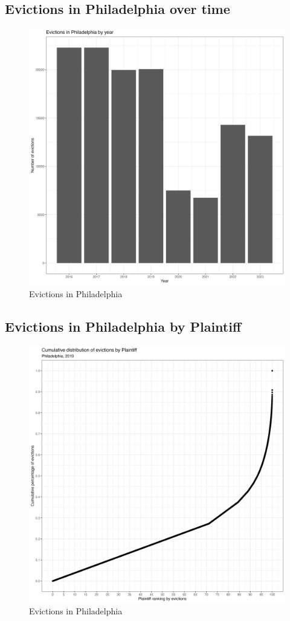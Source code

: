 \documentclass{article}
\begin{document}
\subsection{Evictions in Philadelphia over time}

\begin{figure}[htbp]
    \centering
    \includegraphics[width=0.6\linewidth]{figs/evict_by_year.png}
    \caption{Evictions in Philadelphia}
    \label{fig:philly-map}
\end{figure}

\subsection{Evictions in Philadelphia by Plaintiff}
\begin{figure}[htbp]
    \centering
    \includegraphics[width=0.6\linewidth]{figs/cumulative_evict_dist_plaintiff_hist.png}
    \caption{Evictions in Philadelphia}
    \label{fig:philly-map}
\end{figure}
\end{document}
